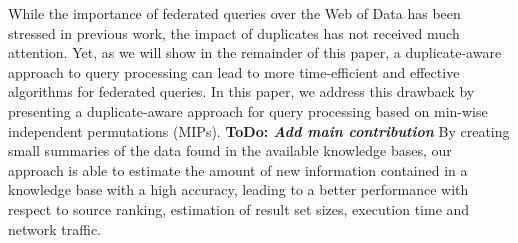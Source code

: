 \documentclass{sig-alternate}  %
\newcommand{\todo}[1]{\textbf{ToDo: \textit{#1}}}
\begin{document}
While the importance of federated queries over the Web of Data has been stressed in previous work, the impact of duplicates has not received much attention.
Yet, as we will show in the remainder of this paper, a duplicate-aware approach to query processing can lead to more time-efficient and effective algorithms for federated queries.
In this paper, we address this drawback by presenting a duplicate-aware approach for query processing based on min-wise independent permutations (MIPs).
\todo{Add main contribution}
%
%
By creating small summaries of the data found in the available knowledge bases, our approach is able to estimate the amount of new information contained in a knowledge base with a high accuracy, leading to a better performance with respect to source ranking, estimation of result set sizes, execution time and network traffic. 
\end{document}
